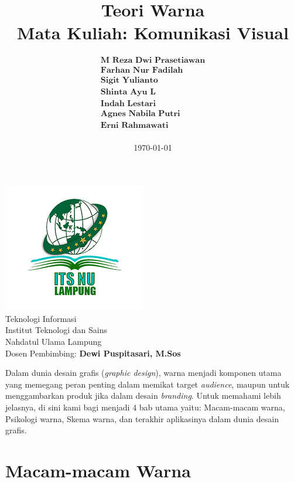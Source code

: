 \documentclass[a4paper]{article}
\title{
  \vspace{-3cm}
  \centering
  \vspace{1cm}
  \textbf{Teori Warna}\\
  \large Mata Kuliah: \textbf{Komunikasi Visual}
}
\author{$\begin{array}{c}
  \textbf{M Reza Dwi Prasetiawan}\\
  \textbf{Farhan Nur Fadilah}\\
  \textbf{Sigit Yulianto}\\
  \textbf{Shinta Ayu L}\\
  \textbf{Indah Lestari}\\
  \textbf{Agnes Nabila Putri}\\
  \textbf{Erni Rahmawati}\\
\end{array}$
}
\date{\today}
\begin{document}
\begin{titlepage}
  \maketitle
  \vfill
  \begin{center}
    \includegraphics[width=\textwidth]{resources/logo-univ.png}\\
    \large
    Teknologi Informasi\\
    Institut Teknologi dan Sains\\
    Nahdatul Ulama Lampung\\
    Dosen Pembimbing: \textbf{Dewi Puspitasari, M.Sos}
  \end{center}
\end{titlepage}

\newpage
{}
\tableofcontents
\newpage

Dalam dunia desain grafis (\textit{graphic design}), warna menjadi komponen utama yang memegang peran penting dalam memikat target \textit{audience}, maupun untuk menggambarkan produk jika dalam desain \textit{branding}. Untuk memahami lebih jelasnya, di sini kami bagi menjadi 4 bab utama yaitu: Macam-macam warna, Psikologi warna, Skema warna, dan terakhir aplikasinya dalam dunia desain grafis.

\section{Macam-macam Warna}
\end{document}
